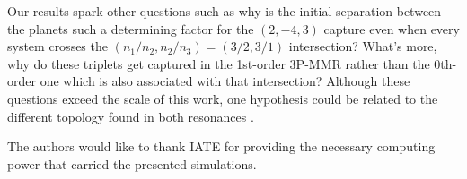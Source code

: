 \documentclass[baaa]{baaa}
\begin{document}

Our results spark other questions such as why is the initial separation between the planets such a determining factor for the $(2,-4,3)$ capture even when every system crosses the $(n_1/n_2,n_2/n_3)=(3/2,3/1)$ intersection? 
What's more, why do these triplets get captured in the 1st-order 3P-MMR rather than the 0th-order one which is also associated with that intersection?
Although these questions exceed the scale of this work, one hypothesis could be related to the different topology found in both resonances \citep{petit.2021}.












\begin{acknowledgement}
The authors would like to thank IATE for providing the necessary computing power that carried the presented simulations.
\end{acknowledgement}



\small

 
\end{document}
